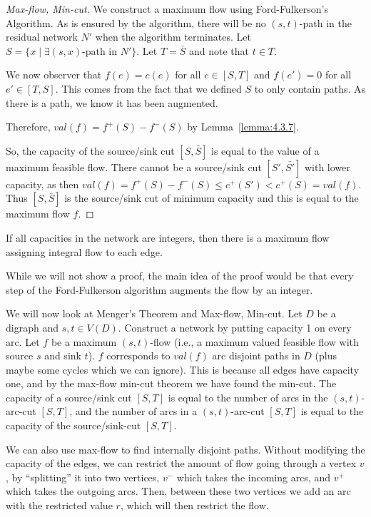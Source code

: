 \documentclass{Book}
\begin{document}
\begin{proof}[Max-flow, Min-cut]
	We construct a maximum flow using Ford-Fulkerson's Algorithm. As is ensured by the algorithm, there will be no $(s,t)$-path in the residual network $N'$ when the algorithm terminates. Let $S = \{x \mid \exists (s,x)\text{-path in }N' \}$. Let $T = \bar{S}$ and note that $t \in T$.

	We now observer that $f(e) = c(e)$ for all $e \in [S, T]$ and $f(e') = 0$ for all $e' \in [T, S]$. This comes from the fact that we defined $S$ to only contain paths. As there is a path, we know it has been augmented.

	Therefore, $val(f) = f^{+}(S) - f^{-}(S)$ by Lemma~\ref{lemma:4.3.7}.

	So, the capacity of the source/sink cut $[S, \bar{S}]$ is equal to the value of a maximum feasible flow. There cannot be a source/sink cut $[S', \bar{S'}]$ with lower capacity, as then $val(f) = f^{+}(S) - f^{-}(S) \le c^{+}(S') < c^{+}(S) = val(f)$. Thus $[S, \bar{S}]$ is the source/sink cut of minimum capacity and this is equal to the maximum flow $f$.
\end{proof}

\begin{corollary}
	If all capacities in the network are integers, then there is a maximum flow assigning integral flow to each edge.
\end{corollary}

While we will not show a proof, the main idea of the proof would be that every step of the Ford-Fulkerson algorithm augments the flow by an integer.

We will now look at Menger's Theorem and Max-flow, Min-cut. Let $D$ be a digraph and $s, t \in V(D)$. Construct a network by putting capacity 1 on every arc. Let $f$ be a maximum $(s,t)$-flow (i.e., a maximum valued feasible flow with source $s$ and sink $t$). $f$ corresponds to $val(f)$ arc disjoint paths in $D$ (plus maybe some cycles which we can ignore). This is because all edges have capacity one, and by the max-flow min-cut theorem we have found the min-cut. The capacity of a source/sink cut $[S,T]$ is equal to the number of arcs in the $(s,t)$-arc-cut $[S,T]$, and the number of arcs in a $(s,t)$-arc-cut $[S,T]$ is equal to the capacity of the source/sink-cut $[S,T]$.

We can also use max-flow to find internally disjoint paths. Without modifying the capacity of the edges, we can restrict the amount of flow going through a vertex $v$, by ``splitting'' it into two vertices, $v^{-}$ which takes the incoming arcs, and $v^{+}$ which takes the outgoing arcs. Then, between these two vertices we add an arc with the restricted value $r$, which will then restrict the flow.
\end{document}

